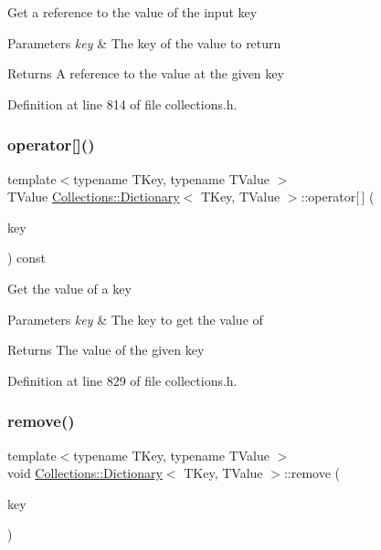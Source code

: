 Get a reference to the value of the input key 
\begin{DoxyParams}{Parameters}
{\em key} & The key of the value to return \\
\hline
\end{DoxyParams}
\begin{DoxyReturn}{Returns}
A reference to the value at the given key 
\end{DoxyReturn}


Definition at line 814 of file collections.\+h.

\hypertarget{class_collections_1_1_dictionary_a74c0362900e4d8084baf72c6a58105fc}{}\label{class_collections_1_1_dictionary_a74c0362900e4d8084baf72c6a58105fc} 
\subsubsection{\texorpdfstring{operator[]()}{operator[]()}\hspace{0.1cm}{\footnotesize\ttfamily [2/2]}}
{\footnotesize\ttfamily template$<$typename T\+Key, typename T\+Value $>$ \\
T\+Value \hyperlink{class_collections_1_1_dictionary}{Collections\+::\+Dictionary}$<$ T\+Key, T\+Value $>$\+::operator\mbox{[}$\,$\mbox{]} (\begin{DoxyParamCaption}\item[{T\+Key}]{key }\end{DoxyParamCaption}) const}

Get the value of a key 
\begin{DoxyParams}{Parameters}
{\em key} & The key to get the value of \\
\hline
\end{DoxyParams}
\begin{DoxyReturn}{Returns}
The value of the given key 
\end{DoxyReturn}


Definition at line 829 of file collections.\+h.

\hypertarget{class_collections_1_1_dictionary_a761db4a7547c513bb9df5f91e7367c73}{}\label{class_collections_1_1_dictionary_a761db4a7547c513bb9df5f91e7367c73} 
\subsubsection{\texorpdfstring{remove()}{remove()}}
{\footnotesize\ttfamily template$<$typename T\+Key, typename T\+Value $>$ \\
void \hyperlink{class_collections_1_1_dictionary}{Collections\+::\+Dictionary}$<$ T\+Key, T\+Value $>$\+::remove (\begin{DoxyParamCaption}\item[{T\+Key}]{key }\end{DoxyParamCaption})}

